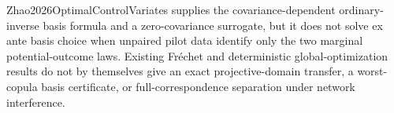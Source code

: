 Zhao2026OptimalControlVariates supplies the covariance-dependent ordinary-inverse basis formula and a zero-covariance surrogate, but it does not solve ex ante basis choice when unpaired pilot data identify only the two marginal potential-outcome laws.  Existing Fr\'echet and deterministic global-optimization results do not by themselves give an exact projective-domain transfer, a worst-copula basis certificate, or full-correspondence separation under network interference.